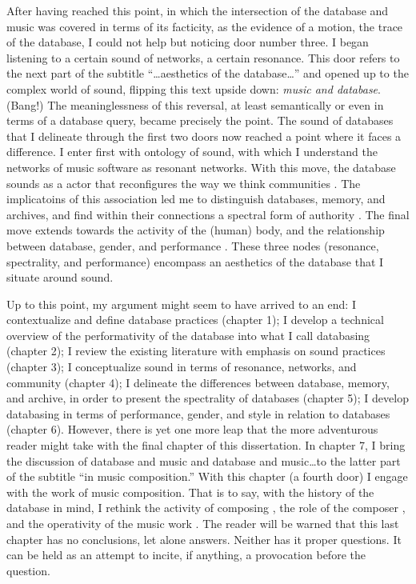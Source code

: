After having reached this point, in which the intersection of the database and music was covered in terms of its facticity, as the evidence of a motion, the trace of the database, I could not help but noticing door number three. I began listening to a certain sound of networks, a certain resonance. This door refers to the next part of the subtitle ``\dots aesthetics of the database\dots'' and opened up to the complex world of sound, flipping this text upside down: \textit{music and database}. (Bang!) The meaninglessness of this reversal, at least semantically or even in terms of a database query, became precisely the point. The sound of databases that I delineate through the first two doors now reached a point where it faces a difference. I enter first with  ontology of sound, with which I understand the networks of music software as resonant networks. With this move, the database sounds as a actor \parencite{Lat90:On} that reconfigures the way we think communities \parencite{Nan91:The}. The implicatoins of this association led me to distinguish databases, memory, and archives, and find within their connections a spectral form of authority \parencites{Der78:Wri}{Der95:Arc}. The final move extends towards the activity of the (human) body, and the relationship between database, gender, and performance \parencite{But88:Per}. These three nodes (resonance, spectrality, and performance) encompass an aesthetics of the database that I situate around sound. 

Up to this point, my argument might seem to have arrived to an end: I contextualize and define database practices (chapter 1); I develop a technical overview of the performativity of the database into what I call databasing (chapter 2); I review the existing literature with emphasis on sound practices (chapter 3); I conceptualize sound in terms of resonance, networks, and community (chapter 4); I delineate the differences between database, memory, and archive, in order to present the spectrality of databases (chapter 5); I develop databasing in terms of performance, gender, and style in relation to databases (chapter 6). However, there is yet one more leap that the more adventurous reader might take with the final chapter of this dissertation. In chapter 7, I bring the discussion of database and music and database and music\dots to the latter part of the subtitle ``in music composition.'' With this chapter (a fourth door) I engage with the work of music composition. That is to say, with the history of the database in mind, I rethink the activity of composing \parencite{Vag01:Som}, the role of the composer \parencite{Lew99:Int}, and the operativity of the music work \parencite{Cas00:The}. The reader will be warned that this last chapter has no conclusions, let alone answers. Neither has it proper questions. It can be held as an attempt to incite, if anything, a provocation before the question.

